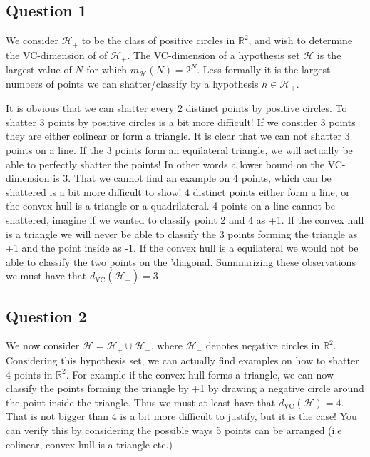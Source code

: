 \subsection{Question 1}
We consider $\mathcal{H}_+$ to be the class of positive circles in $\mathbb{R}^2$, and wish to determine the VC-dimension of of $\mathcal{H}_+$. The VC-dimension of a hypothesis set $\mathcal{H}$ is the largest value of $N$ for which $m_{\mathcal{H}}(N)=2^N$. Less formally it is the largest numbers of points we can shatter/classify by a hypothesis $h \in \mathcal{H}_+$.

 It is obvious that we can shatter every 2 distinct points by positive circles. To shatter 3 points by positive circles is a bit more difficult! If we consider 3 points they are either colinear or form a triangle. It is clear that we can not shatter 3 points on a line. If the 3 points form an equilateral triangle, we will actually be able to perfectly shatter the points! In other words a lower bound on the VC-dimension is 3. That we cannot find an example on 4 points, which can be shattered is a bit more difficult to show! 4 distinct points either form a line, or the convex hull is a triangle or a quadrilateral. 4 points on a line cannot be shattered, imagine if we wanted to classify point 2 and 4 as +1. If the convex hull is a triangle we will never be able to classify the 3 points forming the triangle as +1 and the point inside as -1. If the convex hull is a equilateral we would not be able to classify the two points on the 'diagonal. Summarizing these observations we must have that $d_{\text{VC}}(\mathcal{H}_+)=3$
\subsection{Question 2}
We now consider $\mathcal{H}= \mathcal{H}_+ \cup \mathcal{H}_-$, where $\mathcal{H}_-$ denotes negative circles in $\mathbb{R}^2$. Considering this hypothesis set, we can actually find examples on how to shatter 4 points in $\mathbb{R}^2$. For example if the convex hull forms a triangle, we can now classify the points forming the triangle by +1 by drawing a negative circle around the point inside the triangle. Thus we must at least have that $d_{\text{VC}}(\mathcal{H})=4$. That is not bigger than 4 is a bit more difficult to justify, but it is the case! You can verify this by considering the possible ways 5 points can be arranged (i.e colinear, convex hull is a triangle etc.)   